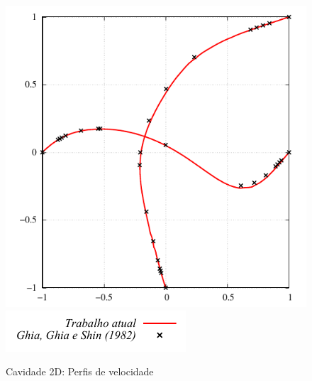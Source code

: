 \begin{figure}[!!htbp]
	\caption{Cavidade 2D: Perfis de velocidade} 
	\centering
	{\includegraphics[scale=0.8,trim=0cm 0cm 0cm 0cm, clip=true]{Imagens/Cap5/cav2d_perfil_vel_Re100.pdf}}\\
	{\includegraphics[scale=1.0,trim=0cm 0cm 0cm 0cm, clip=true]{Imagens/Cap5/cav2d_legenda.pdf}}
	\label{fig:cav2d_perfil_vel_Re100}
\end{figure}
